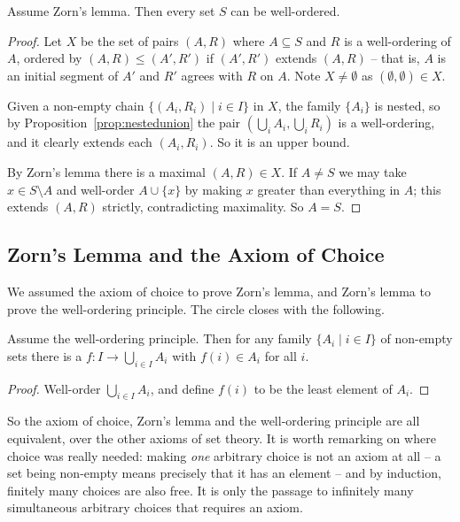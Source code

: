 \documentclass[a4paper]{scrartcl}
\begin{document}
\begin{theorem}\label{thm:wop}
  Assume Zorn's lemma. Then every set $S$ can be well-ordered.
\end{theorem}
\begin{proof}
  Let $X$ be the set of pairs $(A, R)$ where $A \subseteq S$ and $R$ is a well-ordering of $A$, ordered by $(A, R) \leq (A', R')$ if $(A', R')$ extends $(A, R)$ -- that is, $A$ is an initial segment of $A'$ and $R'$ agrees with $R$ on $A$. Note $X \neq \emptyset$ as $(\emptyset, \emptyset) \in X$.

  Given a non-empty chain $\{(A_i, R_i) \mid i \in I\}$ in $X$, the family $\{A_i\}$ is nested, so by Proposition~\ref{prop:nestedunion} the pair $(\bigcup_i A_i, \bigcup_i R_i)$ is a well-ordering, and it clearly extends each $(A_i, R_i)$. So it is an upper bound.

  By Zorn's lemma there is a maximal $(A, R) \in X$. If $A \neq S$ we may take $x \in S \setminus A$ and well-order $A \cup \{x\}$ by making $x$ greater than everything in $A$; this extends $(A, R)$ strictly, contradicting maximality. So $A = S$.
\end{proof}

\subsection{Zorn's Lemma and the Axiom of Choice}

We assumed the axiom of choice to prove Zorn's lemma, and Zorn's lemma to prove the well-ordering principle. The circle closes with the following.

\begin{theorem}
  Assume the well-ordering principle. Then for any family $\{A_i \mid i \in I\}$ of non-empty sets there is a  $f: I \rightarrow \bigcup_{i \in I} A_i$ with $f(i) \in A_i$ for all $i$.
\end{theorem}
\begin{proof}
  Well-order $\bigcup_{i \in I} A_i$, and define $f(i)$ to be the least element of $A_i$.
\end{proof}

So the axiom of choice, Zorn's lemma and the well-ordering principle are all equivalent, over the other axioms of set theory. It is worth remarking on where choice was really needed: making \emph{one} arbitrary choice is not an axiom at all -- a set being non-empty means precisely that it has an element -- and by induction, finitely many choices are also free. It is only the passage to infinitely many simultaneous arbitrary choices that requires an axiom.
\end{document}
